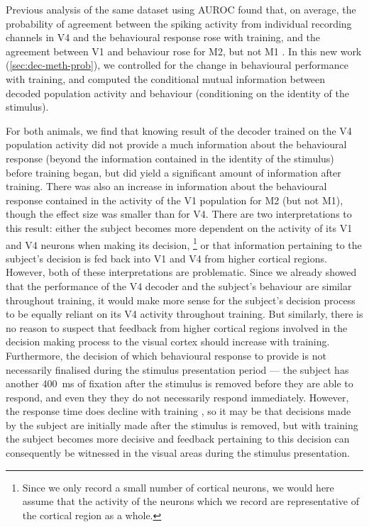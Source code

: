 
Previous analysis of the same dataset using \ac{AUROC} found that, on average, the probability of agreement between the spiking activity from individual recording channels in \ac{V4} and the behavioural response rose with training, and the agreement between \ac{V1} and behaviour rose for \ac{M2}, but not \ac{M1} \citep{Chen2013thesis}.
In this new work (\autoref{sec:dec-meth-prob}), we controlled for the change in behavioural performance with training, and computed the conditional mutual information between decoded population activity and behaviour (conditioning on the identity of the stimulus).

For both animals, we find that knowing result of the decoder trained on the \ac{V4} population activity did not provide a much information about the behavioural response (beyond the information contained in the identity of the stimulus) before training began, but did yield a significant amount of information after training.
There was also an increase in information about the behavioural response contained in the activity of the \ac{V1} population for \ac{M2} (but not \ac{M1}), though the effect size was smaller than for \ac{V4}.
There are two interpretations to this result: either the subject becomes more dependent on the activity of its \ac{V1} and \ac{V4} neurons when making its decision,%
\footnote{Since we only record a small number of cortical neurons, we would here assume that the activity of the neurons which we record are representative of the cortical region as a whole.}
or that information pertaining to the subject's decision is fed back into \ac{V1} and \ac{V4} from higher cortical regions.
However, both of these interpretations are problematic.
Since we already showed that the performance of the \ac{V4} decoder and the subject's behaviour are similar throughout training, it would make more sense for the subject's decision process to be equally reliant on its \ac{V4} activity throughout training.
But similarly, there is no reason to suspect that feedback from higher cortical regions involved in the decision making process to the visual cortex should increase with training.
Furthermore, the decision of which behavioural response to provide is not necessarily finalised during the stimulus presentation period --- the subject has another \SI{400}{\milli\second} of fixation after the stimulus is removed before they are able to respond, and even they they do not necessarily respond immediately.
However, the response time does decline with training \citep{Chen2013,Chen2013thesis}, so it may be that decisions made by the subject are initially made after the stimulus is removed, but with training the subject becomes more decisive and feedback pertaining to this decision can consequently be witnessed in the visual areas during the stimulus presentation.

